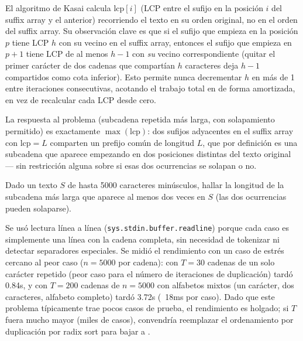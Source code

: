 El algoritmo de Kasai calcula $\mathrm{lcp}[i]$ (LCP entre el sufijo en la posición $i$ del suffix array y el anterior) recorriendo el texto en su orden original, no en el orden del suffix array. Su observación clave es que si el sufijo que empieza en la posición $p$ tiene LCP $h$ con su vecino en el suffix array, entonces el sufijo que empieza en $p+1$ tiene LCP de al menos $h-1$ con \emph{su} vecino correspondiente (quitar el primer carácter de dos cadenas que compartían $h$ caracteres deja $h-1$ compartidos como cota inferior). Esto permite nunca decrementar $h$ en más de 1 entre iteraciones consecutivas, acotando el trabajo total en  de forma amortizada, en vez de recalcular cada LCP desde cero.

La respuesta al problema (subcadena repetida más larga, con solapamiento permitido) es exactamente $\max(\mathrm{lcp})$: dos sufijos adyacentes en el suffix array con $\mathrm{lcp} = L$ comparten un prefijo común de longitud $L$, que por definición es una subcadena que aparece empezando en dos posiciones distintas del texto original — sin restricción alguna sobre si esas dos ocurrencias se solapan o no.


Dado un texto $S$ de hasta 5000 caracteres minúsculos, hallar la longitud de la subcadena más larga que aparece al menos dos veces en $S$ (las dos ocurrencias pueden solaparse).

 Se usó lectura línea a línea (\texttt{sys.stdin.buffer.readline}) porque cada caso es simplemente una línea con la cadena completa, sin necesidad de tokenizar ni detectar separadores especiales. Se midió el rendimiento con un caso de estrés cercano al peor caso ($n=5000$ por cadena): con $T=30$ cadenas de un solo carácter repetido (peor caso para el número de iteraciones de duplicación) tardó 0.84s, y con $T=200$ cadenas de $n=5000$ con alfabetos mixtos (un carácter, dos caracteres, alfabeto completo) tardó 3.72s (~18ms por caso). Dado que este problema típicamente trae pocos casos de prueba, el rendimiento es holgado; si $T$ fuera mucho mayor (miles de casos), convendría reemplazar el ordenamiento por duplicación por radix sort para bajar a .

